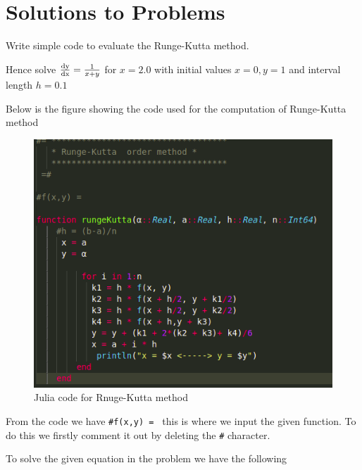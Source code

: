\documentclass[a4paper,12pt,openany]{book}
\begin{document}
\chapter{Solutions to Problems}
\begin{problem}
	Write simple code to evaluate the Runge-Kutta method.
	
	Hence solve $\frac{\rm dy}{\rm dx} = \frac{1}{x + y}$ for $x = 2.0$ with initial values $x=0,y=1$ and interval length $h = 0.1$
\end{problem}

\begin{soln}
	Below is the figure showing the code used for the computation of Runge-Kutta method
	\begin{figure}[H]
		\centering
		\includegraphics[width = .7\linewidth]{pic1}
		\caption{Julia code for Rnuge-Kutta method}
	\end{figure}
From the code we have \texttt{\#f(x,y) =  } this is where we input the given function.
To do this we firstly comment it out by deleting the \texttt{\#} character.

To solve the given equation in the problem we have the following


\end{soln}
\end{document}

